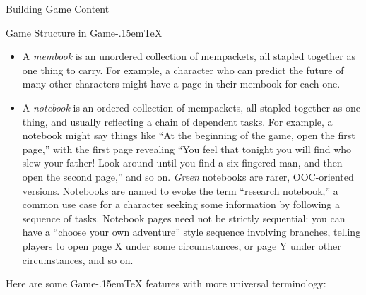 \documentclass[11pt,  total={6in, 8in}]{article}
\def\gametex{\mbox{Game\kern-.15em\TeX}}
\begin{document}
\begin{section}{Building Game Content}
\begin{subsection}{Game Structure in \gametex{}}
\begin{itemize}
    \item A \textit{membook} is an unordered collection of mempackets, all stapled together as one thing to carry.  For example, a character who can predict the future of many other characters might have a page in their membook for each one.
    \item A \textit{notebook} is an ordered collection of mempackets, all stapled together as one thing, and usually reflecting a chain of dependent tasks.  For example, a notebook might say things like ``At the beginning of the game, open the first page,'' with the first page revealing ``You feel that tonight you will find who slew your father!  Look around until you find a six-fingered man, and then open the second page,'' and so on.  \textit{Green} notebooks are rarer, OOC-oriented versions.  Notebooks are named to evoke the term ``research notebook,'' a common use case for a character seeking some information by following a sequence of tasks.
    Notebook pages need not be strictly sequential: you can have a ``choose your own adventure'' style sequence involving branches, telling players to open page X under some circumstances, or page Y under other circumstances, and so on.
\end{itemize}

Here are some \gametex{} features with more universal terminology:


\end{subsection}
\end{section}
\end{document}
